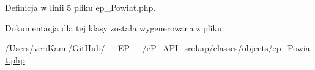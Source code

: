 Definicja w linii 5 pliku ep\-\_\-\-Powiat.\-php.



Dokumentacja dla tej klasy została wygenerowana z pliku\-:\begin{DoxyCompactItemize}
\item 
/\-Users/veri\-Kami/\-Git\-Hub/\-\_\-\-\_\-\-E\-P\-\_\-\-\_\-/e\-P\-\_\-\-A\-P\-I\-\_\-srokap/classes/objects/\hyperlink{ep___powiat_8php}{ep\-\_\-\-Powiat.\-php}\end{DoxyCompactItemize}
